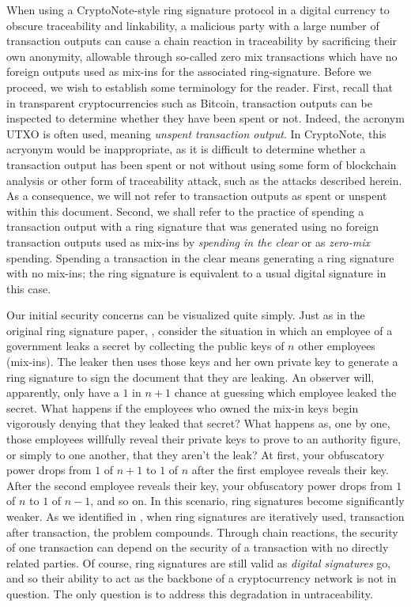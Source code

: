 \documentclass[12pt,english]{mrl}
\theoremstyle{definition}
\numberwithin{equation}{section}
\numberwithin{figure}{section}
\numberwithin{equation}{section}
\numberwithin{equation}{section}
\numberwithin{figure}{section}
\begin{document}
When using a CryptoNote-style ring signature protocol in a digital currency to obscure traceability and linkability, a malicious party with a large number of transaction outputs can cause a chain reaction in traceability by sacrificing their own anonymity, allowable through so-called zero mix transactions which have no foreign outputs used as mix-ins for the associated ring-signature. Before we proceed, we wish to establish some terminology for the reader. First, recall that in transparent cryptocurrencies such as Bitcoin, transaction outputs can be inspected to determine whether they have been spent or not. Indeed, the acronym UTXO is often used, meaning \textit{unspent transaction output}. In CryptoNote, this acryonym would be inappropriate, as it is difficult to determine whether a transaction output has been spent or not without using some form of blockchain analysis or other form of traceability attack, such as the attacks described herein.  As a consequence, we will not refer to transaction outputs as spent or unspent within this document. Second, we shall refer to the practice of spending a transaction output with a ring signature that was generated using no foreign transaction outputs used as mix-ins by \textit{spending in the clear} or as \textit{zero-mix} spending. Spending a transaction in the clear means generating a ring signature with no mix-ins; the ring signature is equivalent to a usual digital signature in this case.

Our initial security concerns can be visualized quite simply. Just as in the original ring signature paper, \cite{rivest2001leak}, consider the situation in which an employee of a government leaks a secret by collecting the public keys of $n$ other employees (mix-ins). The leaker then uses those keys and her own private key to generate a ring signature to sign the document that they are leaking. An observer will, apparently, only have a $1$ in $n+1$ chance at guessing which employee leaked the secret. What happens if the employees who owned the mix-in keys begin vigorously denying that they leaked that secret? What happens as, one by one, those employees willfully reveal their private keys to prove to an authority figure, or simply to one another, that they aren't the leak? At first, your obfuscatory power drops from $1$ of $n+1$ to $1$ of $n$ after the first employee reveals their key. After the second employee reveals their key, your obfuscatory power drops from $1$ of $n$ to $1$ of $n-1$, and so on. In this scenario, ring signatures become significantly weaker. As we identified in \cite{chainReactions}, when ring signatures are iteratively used, transaction after transaction, the problem compounds. Through chain reactions, the security of one transaction can depend on the security of a transaction with no directly related parties.  Of course, ring signatures are still valid as \textit{digital signatures} go, and so their ability to act as the backbone of a cryptocurrency network is not in question. The only question is to address this degradation in untraceability.   
\end{document}
